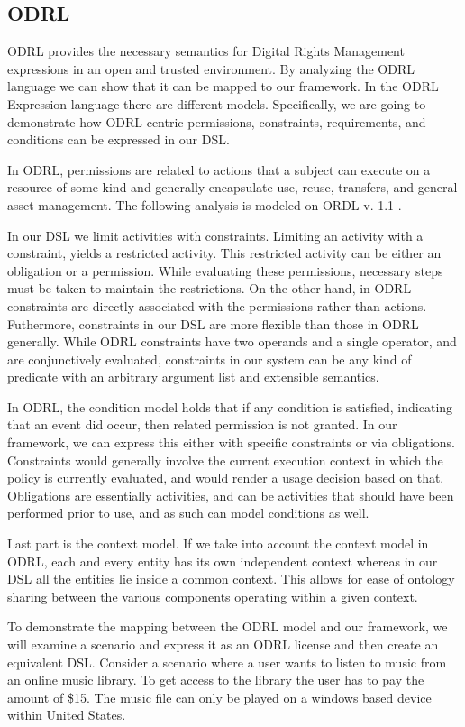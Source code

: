 \subsection{ODRL}\label{sec:model-odrl}
ODRL provides the necessary semantics for Digital Rights Management expressions in an open and trusted environment. By analyzing the ODRL language we can show that it can be mapped to our framework. In the ODRL Expression language there are different models.  Specifically, we are going to demonstrate how ODRL-centric permissions, constraints, requirements, and conditions can be expressed in our DSL.

In ODRL, permissions are related to actions that a subject can execute on a resource of some kind and generally encapsulate use, reuse, transfers, and general asset management.  The following analysis is modeled on ORDL v. 1.1 \cite{Ia:02}.

In our DSL we limit activities with constraints. Limiting an activity with a constraint, yields a restricted activity. This restricted activity can be either an obligation or a permission. While evaluating these permissions, necessary steps must be taken to maintain the restrictions. On the other hand, in ODRL constraints are directly associated with the permissions rather than actions.  Futhermore, constraints in our DSL are more flexible than those in ODRL generally. While ODRL constraints have two operands and a single operator, and are conjunctively evaluated, constraints in our system can be any kind of predicate with an arbitrary argument list and extensible semantics.

In ODRL, the condition model holds that if any condition is satisfied, indicating that an event did occur, then related permission is not granted. In our framework, we can express this either with specific constraints or via obligations.  Constraints would generally involve the current execution context in which the policy is currently evaluated, and would render a usage decision based on that.  Obligations are essentially activities, and can be activities that should have been performed prior to use, and as such can model conditions as well.

Last part is the context model. If we take into account the context model in ODRL, each and every entity has its own independent context whereas in our DSL all the entities lie inside a common context.  This allows for ease of ontology sharing between the various components operating within a given context.

To demonstrate the mapping between the ODRL model and our framework, we will examine a scenario and express it as an ODRL license and then create an equivalent DSL. Consider a scenario where a user wants to listen to music from an online music library. To get access to the library the user has to pay the amount of \$15. The music file can only be played on a windows based device within United States.

